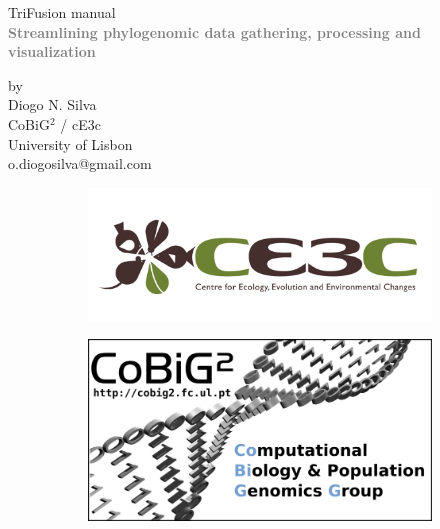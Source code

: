 \documentclass[12pt]{article}
\begin{document}
\begin{titlepage}
    \centering
    \vfill
    {\bfseries\Large
	    \begin{flushleft}
	        \Huge TriFusion manual\\
	        \textcolor{gray}{\textbf{\normalsize Streamlining phylogenomic data gathering, processing and visualization}}
	    \end{flushleft}
    }    
    \vfill
    
    \begin{flushright}
	    by\\
		Diogo N. Silva\\
		CoBiG$^{2}$ /  cE3c\\
		University of Lisbon\\
		o.diogosilva@gmail.com
    \end{flushright}

	\begin{figure}[h]
	\centering
	\begin{subfigure}{.5\textwidth}
	  \centering
	  \includegraphics[width=.9\linewidth]{figures/logo_ce3c.jpg}
	\end{subfigure}%
	\begin{subfigure}{.5\textwidth}
	  \centering
	  \includegraphics[width=.9\linewidth]{figures/logocobig.png}
	\end{subfigure}
	\end{figure}

\end{titlepage}
\end{document}
